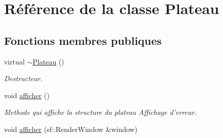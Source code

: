 \hypertarget{classPlateau}{\section{\-Référence de la classe \-Plateau}
\label{classPlateau}
}
\subsection*{\-Fonctions membres publiques}
\begin{DoxyCompactItemize}
\item 
virtual \hyperlink{classPlateau_a0e6ae72e4d7e9923f996c1247e6a6c8b}{$\sim$\-Plateau} ()
\begin{DoxyCompactList}\small\item\em \-Destructeur. \end{DoxyCompactList}\item 
\hypertarget{classPlateau_a122c12319a8843a493fa06fe4f6e55d4}{void \hyperlink{classPlateau_a122c12319a8843a493fa06fe4f6e55d4}{afficher} ()}\label{classPlateau_a122c12319a8843a493fa06fe4f6e55d4}

\begin{DoxyCompactList}\small\item\em \-Methode qui affiche la structure du plateau \-Affichage d'erreur. \end{DoxyCompactList}\item 
\hypertarget{classPlateau_a583f37e119a4951cb03b9e5f9ed5b253}{void \hyperlink{classPlateau_a583f37e119a4951cb03b9e5f9ed5b253}{afficher} (sf\-::\-Render\-Window \&window)}\label{classPlateau_a583f37e119a4951cb03b9e5f9ed5b253}


\end{DoxyCompactItemize}
